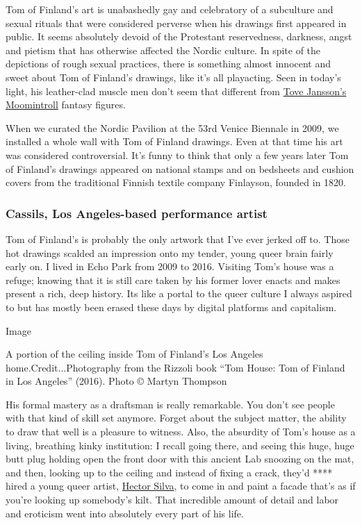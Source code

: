 Tom of Finland's art is unabashedly gay and celebratory of a subculture
and sexual rituals that were considered perverse when his drawings first
appeared in public. It seems absolutely devoid of the Protestant
reservedness, darkness, angst and pietism that has otherwise affected
the Nordic culture. In spite of the depictions of rough sexual
practices, there is something almost innocent and sweet about Tom of
Finland's drawings, like it's all playacting. Seen in today's light, his
leather-clad muscle men don't seem that different from
\href{https://www.nytimes.com/2016/12/15/t-magazine/art/moomin-tove-jansson-adventures-moominland.html}{Tove
Jansson's Moomintroll} fantasy figures.

When we curated the Nordic Pavilion at the 53rd Venice Biennale in 2009,
we installed a whole wall with Tom of Finland drawings. Even at that
time his art was considered controversial. It's funny to think that only
a few years later Tom of Finland's drawings appeared on national stamps
and on bedsheets and cushion covers from the traditional Finnish textile
company Finlayson, founded in 1820.

\hypertarget{cassils-los-angeles-based-performance-artist}{%
\subsubsection{\texorpdfstring{\textbf{Cassils, Los Angeles-based
performance
artist}}{Cassils, Los Angeles-based performance artist}}\label{cassils-los-angeles-based-performance-artist}}

Tom of Finland's is probably the only artwork that I've ever jerked off
to. Those hot drawings scalded an impression onto my tender, young queer
brain fairly early on. I lived in Echo Park from 2009 to 2016. Visiting
Tom's house was a refuge; knowing that it is still care taken by his
former lover enacts and makes present a rich, deep history. Its like a
portal to the queer culture I always aspired to but has mostly been
erased these days by digital platforms and capitalism.

Image

A portion of the ceiling inside Tom of Finland's Los Angeles
home.Credit...Photography from the Rizzoli book ``Tom House: Tom of
Finland in Los Angeles'' (2016). Photo © Martyn Thompson

His formal mastery as a draftsman is really remarkable. You don't see
people with that kind of skill set anymore. Forget about the subject
matter, the ability to draw that well is a pleasure to witness. Also,
the absurdity of Tom's house as a living, breathing kinky institution: I
recall going there, and seeing this huge, huge butt plug holding open
the front door with this ancient Lab snoozing on the mat, and then,
looking up to the ceiling and instead of fixing a crack, they'd ****
hired a young queer artist,
\href{http://www.worldoftomoffinland.com/tomsblog/weekly-artist-focus-hector-silva/}{Hector
Silva}, to come in and paint a facade that's as if you're looking up
somebody's kilt. That incredible amount of detail and labor and
eroticism went into absolutely every part of his life.

